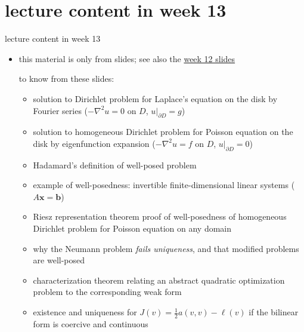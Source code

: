 \documentclass[10pt,
               svgnames,
               hyperref={colorlinks,
                         citecolor=DeepPink4,
                         linkcolor=FireBrick,
                         urlcolor=blue},
               usepdftitle=false]{beamer}
\newcommand{\bb}{\mathbf{b}}
\newcommand{\bx}{\mathbf{x}}
\newcommand{\grad}{\nabla}
\begin{document}
\section{lecture content in week 13}

\begin{frame}{lecture content in week 13}

\begin{itemize}
\item this material is only from slides; see also the \href{https://bueler.github.io/fa/assets/slides/S26/week12.pdf}{week 12 slides}

\begin{block}{to know from these slides:}
\begin{itemize}
\item solution to Dirichlet problem for Laplace's equation on the disk by Fourier series ($-\grad^2 u = 0$ on $D$, $u|_{\partial D}=g$)
\item solution to homogeneous Dirichlet problem for Poisson equation on the disk by eigenfunction expansion ($-\grad^2 u = f$ on $D$, $u|_{\partial D}=0$)
\item Hadamard's definition of well-posed problem
\item example of well-posedness: invertible finite-dimensional linear systems ($A\bx=\bb$)
\item Riesz representation theorem proof of well-posedness of homogeneous Dirichlet problem for Poisson equation on any domain
\item why the Neumann problem \emph{fails uniqueness}, and that modified problems are well-posed
\item characterization theorem relating an abstract quadratic optimization problem to the corresponding weak form
\item existence and uniqueness for $J(v)=\frac{1}{2} a(v,v)-\ell(v)$ if the bilinear form is coercive and continuous
\end{itemize}
\end{block}

\end{itemize}
\end{frame}
\end{document}
